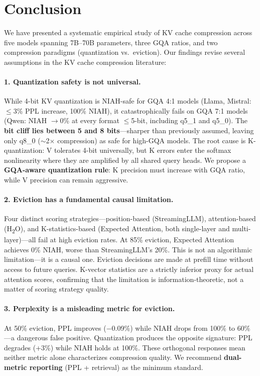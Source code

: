 \section{Conclusion}
\label{sec:conclusion}

We have presented a systematic empirical study of KV cache compression across five models spanning 7B--70B parameters, three GQA ratios, and two compression paradigms (quantization vs.\ eviction). Our findings revise several assumptions in the KV cache compression literature:

\paragraph{1. Quantization safety is not universal.}
While 4-bit KV quantization is NIAH-safe for GQA 4:1 models (Llama, Mistral: $\leq$3\% PPL increase, 100\% NIAH), it catastrophically fails on GQA 7:1 models (Qwen: NIAH $\to$0\% at every format $\leq$5-bit, including q5\_1 and q5\_0). The \textbf{bit cliff lies between 5 and 8 bits}---sharper than previously assumed, leaving only q8\_0 ($\sim$2$\times$ compression) as safe for high-GQA models. The root cause is K-quantization: V tolerates 4-bit universally, but K errors enter the softmax nonlinearity where they are amplified by all shared query heads. We propose a \textbf{GQA-aware quantization rule}: K precision must increase with GQA ratio, while V precision can remain aggressive.

\paragraph{2. Eviction has a fundamental causal limitation.}
Four distinct scoring strategies---position-based (StreamingLLM), attention-based (H\textsubscript{2}O), and K-statistics-based (Expected Attention, both single-layer and multi-layer)---all fail at high eviction rates. At 85\% eviction, Expected Attention achieves 0\% NIAH, worse than StreamingLLM's 20\%. This is not an algorithmic limitation---it is a causal one. Eviction decisions are made at prefill time without access to future queries. K-vector statistics are a strictly inferior proxy for actual attention scores, confirming that the limitation is information-theoretic, not a matter of scoring strategy quality.

\paragraph{3. Perplexity is a misleading metric for eviction.}
At 50\% eviction, PPL improves ($-$0.09\%) while NIAH drops from 100\% to 60\%---a dangerous false positive. Quantization produces the opposite signature: PPL degrades (+3\%) while NIAH holds at 100\%. These orthogonal responses mean neither metric alone characterizes compression quality. We recommend \textbf{dual-metric reporting} (PPL + retrieval) as the minimum standard.

